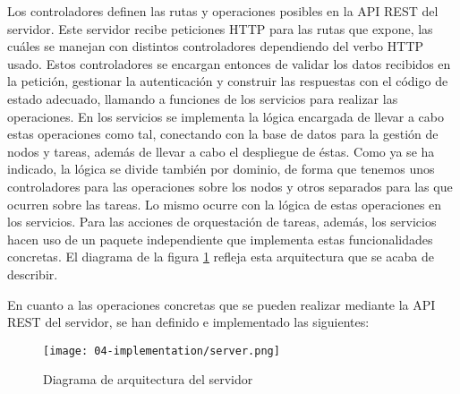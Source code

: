 Los controladores definen las rutas y operaciones posibles en la API REST del
servidor. Este servidor recibe peticiones HTTP para las rutas que expone, las
cuáles se manejan con distintos controladores dependiendo del verbo HTTP usado.
Estos controladores se encargan entonces de validar los datos recibidos en la
petición, gestionar la autenticación y construir las respuestas con el código de
estado adecuado, llamando a funciones de los servicios para realizar las
operaciones. En los servicios se implementa la lógica encargada de llevar a cabo
estas operaciones como tal, conectando con la base de datos para la gestión de
nodos y tareas, además de llevar a cabo el despliegue de éstas. Como ya se ha
indicado, la lógica se divide también por dominio, de forma que tenemos unos
controladores para las operaciones sobre los nodos y otros separados para las
que ocurren sobre las tareas. Lo mismo ocurre con la lógica de estas operaciones
en los servicios. Para las acciones de orquestación de tareas, además, los
servicios hacen uso de un paquete independiente que implementa estas
funcionalidades concretas. El diagrama de la figura
\ref{fig:04-server_architecture} refleja esta arquitectura que se acaba de
describir.

En cuanto a las operaciones concretas que se pueden realizar mediante la API
REST del servidor, se han definido e implementado las siguientes:

\begin{figure}
    \centering
    \texttt{[image: 04-implementation/server.png]}
    \caption{Diagrama de arquitectura del servidor}
    \label{fig:04-server_architecture}
\end{figure}

